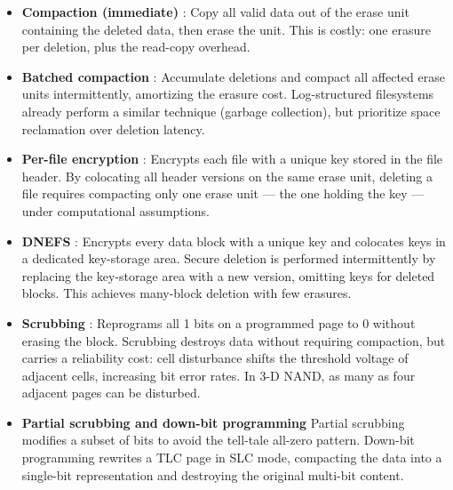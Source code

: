 \begin{itemize}
    \item \textbf{Compaction (immediate)} : Copy all valid data out of the erase unit containing the 
    deleted data, then erase the unit. This is costly: one erasure per deletion, plus the read-copy 
    overhead.

    \item \textbf{Batched compaction} : Accumulate deletions and compact all affected erase units 
    intermittently, amortizing the erasure cost. Log-structured filesystems already perform a 
    similar technique (garbage collection), but prioritize space reclamation over deletion latency.

    \item \textbf{Per-file encryption} : Encrypts each file with a unique key stored in 
    the file header. By colocating all header versions on the same erase unit, deleting a file 
    requires compacting only one erase unit — the one holding the key — under computational 
    assumptions.

    \item \textbf{DNEFS} : Encrypts every data block with a unique key and colocates 
    keys in a dedicated key-storage area. Secure deletion is performed intermittently by replacing 
    the key-storage area with a new version, omitting keys for deleted blocks. This achieves 
    many-block deletion with few erasures.

    \item \textbf{Scrubbing} : Reprograms all 1 bits on a programmed page to 0 without 
    erasing the block. Scrubbing destroys data without requiring compaction, but carries a 
    reliability cost: cell disturbance shifts the threshold voltage of adjacent cells, increasing bit 
    error rates. In 3-D NAND, as many as four adjacent pages can be disturbed\cite{3dnandwang2018}.
    
    \item \textbf{Partial scrubbing and down-bit programming} Partial scrubbing modifies a subset of 
    bits to avoid the tell-tale all-zero pattern. Down-bit programming rewrites a TLC page in SLC 
    mode, compacting the data into a single-bit representation and destroying the original multi-bit 
    content\cite{ahn2019schemes}.
\end{itemize}


